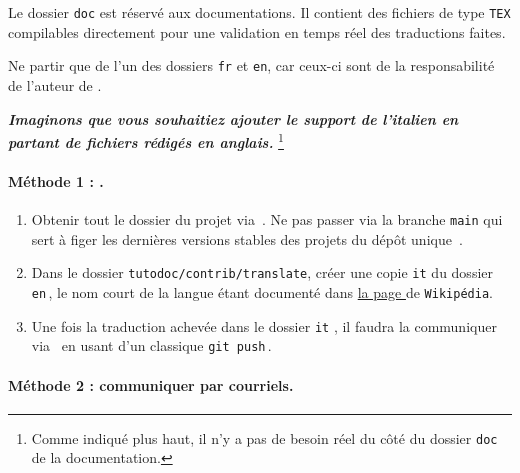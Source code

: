 \begin{tdocnote}
    Le dossier \verb#doc# est réservé aux documentations. Il contient des fichiers de type \verb#TEX# compilables directement pour une validation en temps réel des traductions faites.
\end{tdocnote}


\begin{tdocwarn}
    Ne partir que de l'un des dossiers \verb#fr# et \verb#en#, car ceux-ci sont de la responsabilité de l'auteur de \thisproj.
\end{tdocwarn}


\medskip


\emph{\textbf{Imaginons que vous souhaitiez ajouter le support de l'italien en partant de fichiers rédigés en anglais.}}%
\footnote{
    Comme indiqué plus haut, il n'y a pas de besoin réel du côté du dossier \texttt{doc} de la documentation.
}


\paragraph{Méthode 1 : \git.}

\begin{enumerate}
    \item Obtenir tout le dossier du projet via \thisrepo\,.
    Ne pas passer via la branche \verb#main# qui sert à figer les dernières versions stables des projets du dépôt unique \thismonorepo\,.

    \item Dans le dossier \verb#tutodoc/contrib/translate#, créer une copie \verb#it# du dossier \verb#en#\,, le nom court de la langue étant documenté dans
    \href{https://en.wikipedia.org/wiki/IETF_language_tag#List_of_common_primary_language_subtags}%
         {la page }
    de \texttt{Wikipédia}.

    \item Une fois la traduction achevée dans le dossier \verb#it# , il faudra la communiquer via \thisrepo\ en usant d'un classique \verb#git push#\,.
\end{enumerate}


\paragraph{Méthode 2 : communiquer par courriels.}

